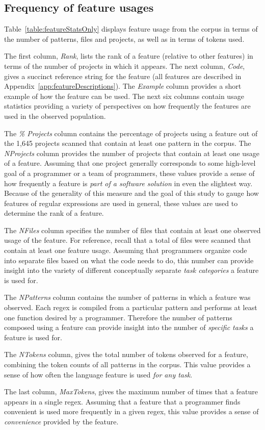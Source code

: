 \subsection{Frequency of feature usages}
\label{sec:featureResults}



Table~\ref{table:featureStatsOnly} displays feature usage from the corpus in terms of the number of patterns, files and projects, as well as in terms of tokens used.

The first column, \emph{Rank}, lists the rank of a feature (relative to other features) in terms of the number of projects in which it appears. The next column, \emph{Code}, gives a succinct reference string for the feature (all features are described in Appendix~\ref{app:featureDescriptions}). The \emph{Example} column provides a short example of how the feature can be used.  The next six columns contain usage statistics providing a variety of perspectives on how frequently the features are used in the observed population.

The \emph{\% Projects} column contains the percentage of projects  using a feature out of the 1,645 projects scanned that contain at least one pattern in the corpus.  The \emph{NProjects} column provides the number of projects that contain at least one usage of a feature.  Assuming that one project generally corresponds to some high-level goal of a programmer or a team of programmers, these values provide a sense of how frequently a feature is \emph{part of a software solution} in even the slightest way.  Because of the generality of this measure and the goal of this study to gauge how features of regular expressions are used in general, these values are used to determine the rank of a feature.

The \emph{NFiles} column specifies the number of files that contain at least one observed usage of the feature.  For reference, recall that a total of  files were scanned that contain at least one feature usage.  Assuming that programmers organize code into separate files based on what the code needs to do, this number can provide insight into the variety of different conceptually separate \emph{task categories} a feature is used for.

The \emph{NPatterns} column contains the number of patterns in which a feature was observed. Each regex is compiled from a particular pattern and performs at least one function desired by a programmer.  Therefore the number of patterns composed using a feature can provide insight into the number of \emph{specific tasks} a feature is used for.

The \emph{NTokens} column, gives the total number of tokens observed for a feature, combining the token counts of all patterns in the corpus.  This value provides a sense of how often the language feature is used \emph{for any task}.

The last column, \emph{MaxTokens}, gives the maximum number of times that a feature appears in a single regex.  Assuming that a feature that a programmer finds convenient is used more frequently in a given regex, this value provides a sense of \emph{convenience} provided by the feature.
